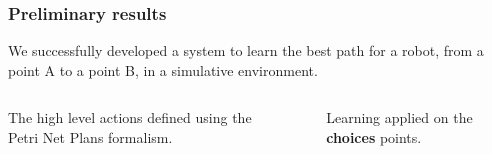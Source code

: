 \begin{frame}
	\frametitle{Preliminary results}
	
	\vspace{0.3cm}
	
	We successfully developed a system to learn the best path for a robot, from a point A to a point B, in a
	simulative environment.
	
	\begin{center}
	\end{center}
	
	\vspace{-0.1cm}
	
	\begin{columns}
		
		\centering
		The high level actions defined using the Petri Net Plans formalism.
		
		\vspace{-0.1cm}
		
		\begin{center}
		\end{center}
		
		
		\centering
		Learning applied on the \textbf{choices} points.
		
		\vspace{-0.1cm}
		
		\begin{center}
		\end{center}
	\end{columns}
\end{frame}

